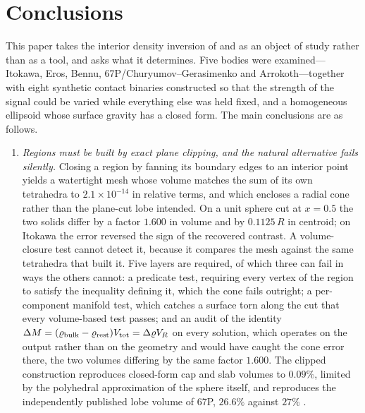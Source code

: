 \section{Conclusions}
\label{sec:conclusions}

This paper takes the interior density inversion of \citet{richardson2014}
and \citet{kanamaru2019} as an object of study rather than as a tool, and
asks what it determines. Five bodies were examined---Itokawa, Eros,
Bennu, 67P/Churyumov--Gerasimenko and Arrokoth---together with eight
synthetic contact binaries constructed so that the strength of the signal
could be varied while everything else was held fixed, and a homogeneous
ellipsoid whose surface gravity has a closed form. The main conclusions
are as follows.

\begin{enumerate}

\item \emph{Regions must be built by exact plane clipping, and the
natural alternative fails silently.} Closing a region by fanning its
boundary edges to an interior point yields a watertight mesh whose volume
matches the sum of its own tetrahedra to $2.1\times10^{-14}$ in relative
terms, and which encloses a radial cone rather than the plane-cut lobe
intended. On a unit sphere cut at $x = 0.5$ the two solids differ by a
factor $1.600$ in volume and by $0.1125\,R$ in centroid; on Itokawa the
error reversed the sign of the recovered contrast. A volume-closure test
cannot detect it, because it compares the mesh against the same
tetrahedra that built it. Five layers are required, of which three can
fail in ways the others cannot: a predicate test, requiring every vertex
of the region to satisfy the inequality defining it, which the cone fails
outright; a per-component manifold test, which catches a surface torn
along the cut that every volume-based test passes; and an audit of the
identity $\Delta M = (\varrho_{\mathrm{bulk}}-\varrho_{\mathrm{rest}})V_{\mathrm{tot}} = \Delta\varrho V_{R}$ on every
solution, which operates on the output rather than on the geometry and
would have caught the cone error there, the two volumes differing by the
same factor $1.600$. The clipped construction reproduces closed-form cap
and slab volumes to $0.09\%$, limited by the polyhedral approximation of
the sphere itself, and reproduces the independently published lobe volume
of 67P, $26.6\%$ against $27\%$ \citep{jorda2016}.


\end{enumerate}
